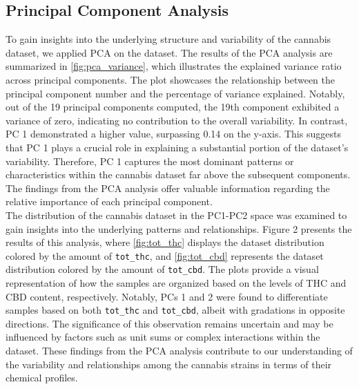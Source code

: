 \documentclass[11pt,a4paper]{article}
\newcommand{\noi}{\noindent}
\begin{document}
\subsection{Principal Component Analysis}
To gain insights into the underlying structure and variability of the cannabis dataset, we applied PCA on the dataset. The results of the PCA analysis are summarized in \autoref{fig:pca_variance}, which illustrates the explained variance ratio across principal components. The plot showcases the relationship between the principal component number and the percentage of variance explained. Notably, out of the 19 principal components computed, the 19th component exhibited a variance of zero, indicating no contribution to the overall variability. In contrast, PC 1 demonstrated a higher value, surpassing 0.14 on the y-axis. This suggests that PC 1 plays a crucial role in explaining a substantial portion of the dataset's variability. Therefore, PC 1 captures the most dominant patterns or characteristics within the cannabis dataset far above the subsequent components. The findings from the PCA analysis offer valuable information regarding the relative importance of each principal component.\\

\noi
The distribution of the cannabis dataset in the PC1-PC2 space was examined to gain insights into the underlying patterns and relationships. Figure 2 presents the results of this analysis, where \autoref{fig:tot_thc} displays the dataset distribution colored by the amount of \texttt{tot\_thc}, and \autoref{fig:tot_cbd} represents the dataset distribution colored by the amount of \texttt{tot\_cbd}. The plots provide a visual representation of how the samples are organized based on the levels of THC and CBD content, respectively. Notably, PCs 1 and 2 were found to differentiate samples based on both \texttt{tot\_thc} and \texttt{tot\_cbd}, albeit with gradations in opposite directions. The significance of this observation remains uncertain and may be influenced by factors such as unit sums or complex interactions within the dataset. These findings from the PCA analysis contribute to our understanding of the variability and relationships among the cannabis strains in terms of their chemical profiles.
\end{document}
